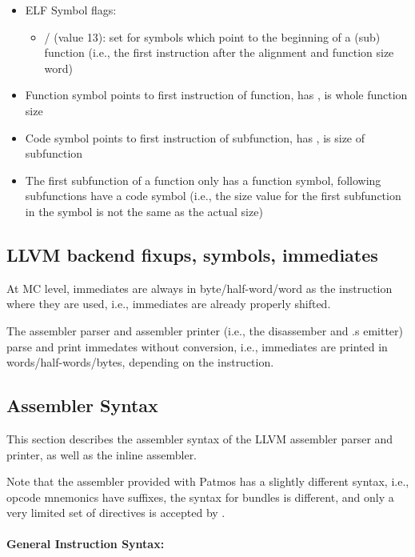 \begin{itemize}
\item ELF Symbol flags:
  \begin{itemize}
  \item {} /  (value 13): set for symbols which point to the beginning of a (sub) function
      (i.e., the first instruction after the alignment and function size word)
  \end{itemize}
\item Function symbol points to first instruction of function, has ,  is whole function size
\item Code symbol points to first instruction of subfunction, has ,  is size of subfunction
\item The first subfunction of a function only has a function symbol, following subfunctions have a code symbol (i.e.,
  the size value for the first subfunction in the symbol is not the same as the actual size)
\end{itemize}

\subsection{LLVM backend fixups, symbols, immediates}

At MC level, immediates are always in byte/half-word/word as the instruction where they are used,
i.e., immediates are already properly shifted.

The assembler parser and assembler printer (i.e., the disassember and .s emitter) parse and print
immedates without conversion, i.e., immediates are printed in words/half-words/bytes, depending on
the instruction. 


\subsection{Assembler Syntax}

This section describes the assembler syntax of the LLVM assembler parser and printer, as well as the inline assembler.

Note that the  assembler provided with Patmos has a slightly different syntax, i.e., opcode mnemonics
have suffixes, the syntax for bundles is different, and only a very limited set of directives is accepted by .

\paragraph{General Instruction Syntax:}

